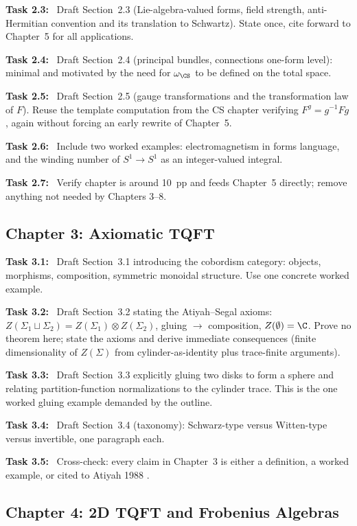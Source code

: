 \documentclass[11pt]{article}
\newcommand{\task}[1]{\medskip\noindent\textbf{Task #1:}\ }
\begin{document}
\task{2.3} Draft Section~2.3 (Lie-algebra-valued forms, field strength, anti-Hermitian
convention and its translation to Schwartz). State once, cite forward to Chapter~5 for
all applications.

\task{2.4} Draft Section~2.4 (principal bundles, connections one-form level): minimal
and motivated by the need for $\omega_{\CS}$ to be defined on the total space.

\task{2.5} Draft Section~2.5 (gauge transformations and the transformation law of $F$).
Reuse the template computation from the CS chapter verifying $F^g=g^{-1}Fg$, again
without forcing an early rewrite of Chapter~5.

\task{2.6} Include two worked examples: electromagnetism in forms language, and the
winding number of $S^1\to S^1$ as an integer-valued integral.

\task{2.7} Verify chapter is around 10~pp and feeds Chapter~5 directly; remove anything
not needed by Chapters 3--8.

\subsection{Chapter 3: Axiomatic TQFT}

\task{3.1} Draft Section~3.1 introducing the cobordism category: objects, morphisms,
composition, symmetric monoidal structure. Use one concrete worked example.

\task{3.2} Draft Section~3.2 stating the Atiyah--Segal axioms: $Z(\Sigma_1\sqcup\Sigma_2)=
Z(\Sigma_1)\otimes Z(\Sigma_2)$, gluing $\to$ composition, $Z(\emptyset)=\C$.
Prove no theorem here; state the axioms and derive immediate consequences (finite
dimensionality of $Z(\Sigma)$ from cylinder-as-identity plus trace-finite arguments).

\task{3.3} Draft Section~3.3 explicitly gluing two disks to form a sphere and relating
partition-function normalizations to the cylinder trace. This is the one worked gluing
example demanded by the outline.

\task{3.4} Draft Section~3.4 (taxonomy): Schwarz-type versus Witten-type versus
invertible, one paragraph each.

\task{3.5} Cross-check: every claim in Chapter~3 is either a definition, a worked
example, or cited to Atiyah 1988 \cite{Atiyah1988TQFT}.

\subsection{Chapter 4: 2D TQFT and Frobenius Algebras}
\end{document}
